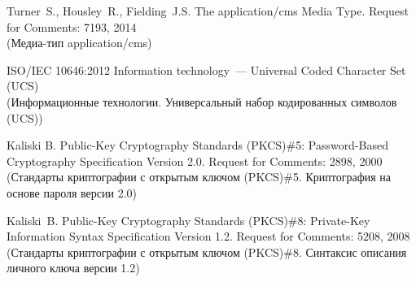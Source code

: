 \begin{thebibliography}{9}
Turner~S., Housley~R., Fielding~J.S.  
The application/cms Media Type. 
Request for Comments: 7193, 2014\\ 
{\small (Медиа-тип application/cms)}
\fi

ISO/IEC 10646:2012 Information technology~--- Universal Coded Character 
Set (UCS)\\
{\small (Информационные технологии. Универсальный набор кодированных 
символов (UCS))}

Kaliski B. 
Public-Key Cryptography Standards (PKCS)\#5: 
Password-Based Cryptography Specification Version 2.0. 
Request for Comments: 2898, 2000\\ 
{\small (Стандарты криптографии с открытым ключом (PKCS)\#5. 
Криптография на основе пароля версии 2.0)}  

Kaliski~B. 
Public-Key Cryptography Standards (PKCS)\#8: 
Private-Key Information Syntax Specification Version 1.2. 
Request for Comments: 5208, 2008\\ 
{\small (Стандарты криптографии с открытым ключом (PKCS)\#8.
Синтаксис описания личного ключа версии 1.2)}  
\label{LastBib}
\end{thebibliography}

